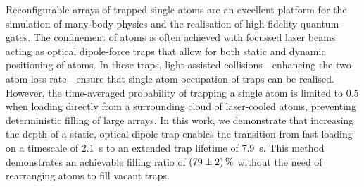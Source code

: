 \documentclass[../Thesis-IJspeert.tex]{subfiles}
\begin{document}
Reconfigurable arrays of trapped single atoms are an excellent platform for the simulation of many-body physics and the realisation of high-fidelity quantum gates. The confinement of atoms is often achieved with focussed laser beams acting as optical dipole-force traps that allow for both static and dynamic positioning of atoms. In these traps, light-assisted collisions---enhancing the two-atom loss rate---ensure that single atom occupation of traps can be realised. However, the time-averaged probability of trapping a single atom is limited to $0.5$ when loading directly from a surrounding cloud of laser-cooled atoms, preventing deterministic filling of large arrays. In this work, we demonstrate that increasing the depth of a static, optical dipole trap enables the transition from fast loading on a timescale of \SI{2.1}{\second} to an extended trap lifetime of \SI{7.9}{\second}. This method demonstrates an achievable filling ratio of $\SI{79\pm2}{\percent}$ without the need of rearranging atoms to fill vacant traps.
\pagebreak
\end{document}
